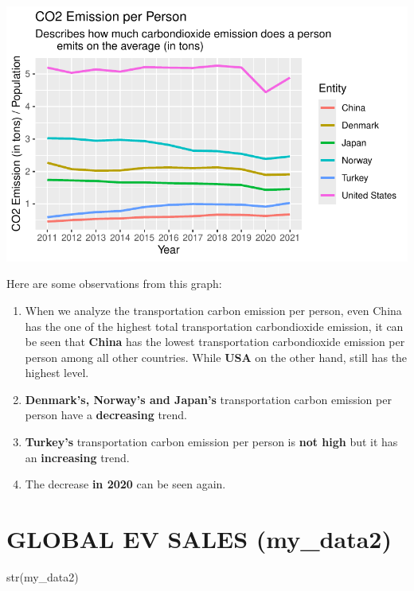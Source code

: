 \documentclass[
  11pt,
  a4paper,
  DIV=11,
  numbers=noendperiod]{scrartcl}
\newenvironment{Shaded}{\begin{snugshade}}{\end{snugshade}}
\newcommand{\FunctionTok}[1]{\textcolor[rgb]{0.28,0.35,0.67}{#1}}
\newcommand{\NormalTok}[1]{\textcolor[rgb]{0.00,0.23,0.31}{#1}}
\begin{document}
\includegraphics{analysis_files/figure-pdf/unnamed-chunk-11-1.pdf}

Here are some observations from this graph:

\begin{enumerate}
\def\labelenumi{\arabic{enumi}.}
\item
  When we analyze the transportation carbon emission per person, even
  China has the one of the highest total transportation carbondioxide
  emission, it can be seen that \textbf{China} has the lowest
  transportation carbondioxide emission per person among all other
  countries. While \textbf{USA} on the other hand, still has the highest
  level.
\item
  \textbf{Denmark's, Norway's and Japan's} transportation carbon
  emission per person have a \textbf{decreasing} trend.
\item
  \textbf{Turkey's} transportation carbon emission per person is
  \textbf{not high} but it has an \textbf{increasing} trend.
\item
  The decrease \textbf{in 2020} can be seen again.
\end{enumerate}

\section{GLOBAL EV SALES (my\_data2)}\label{global-ev-sales-my_data2}

\begin{Shaded}
\begin{Highlighting}[]
\FunctionTok{str}\NormalTok{(my\_data2)}
\end{Highlighting}
\end{Shaded}
\end{document}
